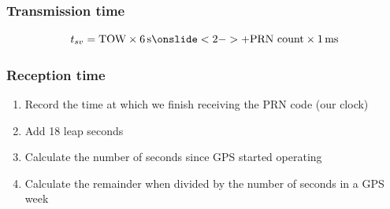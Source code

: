 \documentclass[aspectratio=169, xcolor=table]{beamer}
\begin{document}
\begin{frame}
  \frametitle{Transmission time}

  \centering
  \Large
  \[t_{sv} = \text{TOW} \times \qty{6}{s} \onslide<2->{+ \text{PRN count} \times \qty{1}{ms}}\]
\end{frame}

\begin{frame}
  \frametitle{Reception time}

  \begin{enumerate}
    \item<2-> Record the time at which we finish receiving the PRN code (our clock)
    
    \item<3-> Add 18 leap seconds
    
    \item<4-> Calculate the number of seconds since GPS started operating
    
    \item<5-> Calculate the remainder when divided by the number of seconds in a GPS week
  \end{enumerate}
\end{frame}
\end{document}
